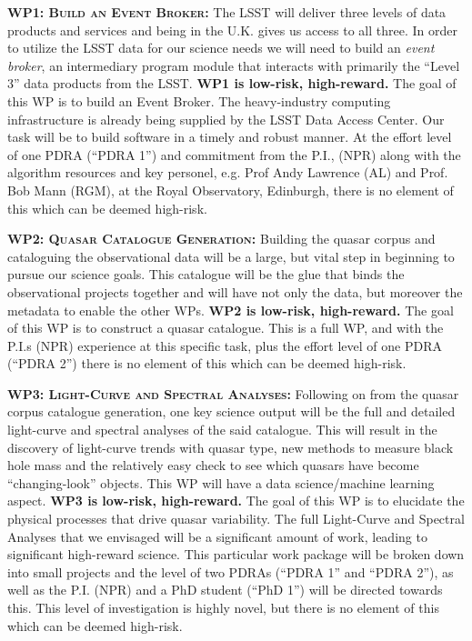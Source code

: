 \documentclass[oneside, a4paper, onecolumn, 11pt]{article}
\begin{document}
\smallskip
\smallskip
\noindent
\textbf{\textsc{WP1: Build an Event Broker:}} 
The LSST will deliver three levels of data products and
services and being in the U.K. gives us access to all three. 
 In order to utilize the LSST data for our science needs we will need to build an {\it event
broker}, an intermediary program module that interacts with primarily
the ``Level 3'' data products from the LSST.
{\bf WP1 is low-risk, high-reward.} 
The goal of this WP is to build an Event Broker.  The heavy-industry
computing infrastructure is already being supplied by the LSST Data
Access Center. Our task will be to build software in a timely and
robust manner. At the effort level of one PDRA (``PDRA 1'') and
commitment from the P.I., (NPR) along with the algorithm resources 
and key personel, e.g. Prof Andy Lawrence (AL) and Prof. Bob Mann (RGM),  
at the Royal Observatory, Edinburgh, there is no
element of this which can be deemed high-risk.


\smallskip
\smallskip
\noindent
\textbf{\textsc{WP2: Quasar Catalogue Generation:}} 
Building the quasar corpus and cataloguing the observational data will
be a large, but vital step in beginning to pursue our science
goals. This catalogue will be the glue that binds the observational
projects together and will have not only the data, but moreover the
metadata to enable the other WPs.
{\bf WP2 is low-risk, high-reward.}
The goal of this WP is to construct a quasar catalogue.
This is a full WP, and with the P.I.s (NPR) experience at this
specific task, plus the effort level of one PDRA (``PDRA 2'') there is
no element of this which can be deemed high-risk.


\smallskip
\smallskip
\noindent
\textbf{\textsc{WP3: Light-Curve and Spectral Analyses:}} 
Following on from the quasar corpus catalogue generation, one key
science output will be the full and detailed light-curve and spectral
analyses of the said catalogue. This will result in the discovery of
light-curve trends with quasar type, new methods to measure black hole
mass and the relatively easy check to see which quasars have become
``changing-look'' objects. This WP will have a data science/machine learning 
aspect.
{\bf WP3 is low-risk, high-reward.} 
The goal of this WP is to elucidate the physical processes that drive quasar variability.
The full Light-Curve and Spectral
Analyses that we envisaged will be a significant amount of work,
leading to significant high-reward science. This particular work
package will be broken down into small projects and the level of two
PDRAs (``PDRA 1'' and ``PDRA 2''), as well as the P.I. (NPR) and a PhD
student (``PhD 1'') will be directed towards this. This level of investigation 
is highly novel, but there is no element of this which can be deemed high-risk.
\end{document}
